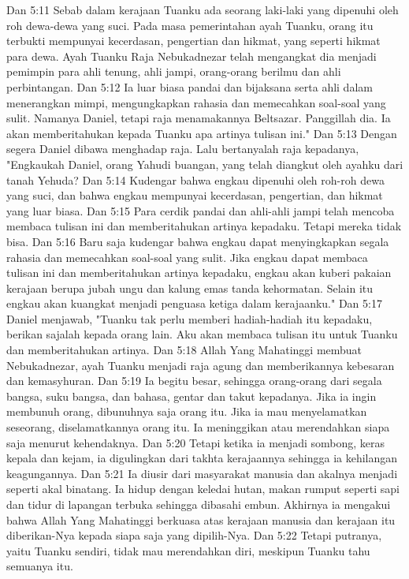 Dan 5:11  Sebab dalam kerajaan Tuanku ada seorang laki-laki yang dipenuhi oleh roh dewa-dewa yang suci. Pada masa pemerintahan ayah Tuanku, orang itu terbukti mempunyai kecerdasan, pengertian dan hikmat, yang seperti hikmat para dewa. Ayah Tuanku Raja Nebukadnezar telah mengangkat dia menjadi pemimpin para ahli tenung, ahli jampi, orang-orang berilmu dan ahli perbintangan.
Dan 5:12  Ia luar biasa pandai dan bijaksana serta ahli dalam menerangkan mimpi, mengungkapkan rahasia dan memecahkan soal-soal yang sulit. Namanya Daniel, tetapi raja menamakannya Beltsazar. Panggillah dia. Ia akan memberitahukan kepada Tuanku apa artinya tulisan ini."
Dan 5:13  Dengan segera Daniel dibawa menghadap raja. Lalu bertanyalah raja kepadanya, "Engkaukah Daniel, orang Yahudi buangan, yang telah diangkut oleh ayahku dari tanah Yehuda?
Dan 5:14  Kudengar bahwa engkau dipenuhi oleh roh-roh dewa yang suci, dan bahwa engkau mempunyai kecerdasan, pengertian, dan hikmat yang luar biasa.
Dan 5:15  Para cerdik pandai dan ahli-ahli jampi telah mencoba membaca tulisan ini dan memberitahukan artinya kepadaku. Tetapi mereka tidak bisa.
Dan 5:16  Baru saja kudengar bahwa engkau dapat menyingkapkan segala rahasia dan memecahkan soal-soal yang sulit. Jika engkau dapat membaca tulisan ini dan memberitahukan artinya kepadaku, engkau akan kuberi pakaian kerajaan berupa jubah ungu dan kalung emas tanda kehormatan. Selain itu engkau akan kuangkat menjadi penguasa ketiga dalam kerajaanku."
Dan 5:17  Daniel menjawab, "Tuanku tak perlu memberi hadiah-hadiah itu kepadaku, berikan sajalah kepada orang lain. Aku akan membaca tulisan itu untuk Tuanku dan memberitahukan artinya.
Dan 5:18  Allah Yang Mahatinggi membuat Nebukadnezar, ayah Tuanku menjadi raja agung dan memberikannya kebesaran dan kemasyhuran.
Dan 5:19  Ia begitu besar, sehingga orang-orang dari segala bangsa, suku bangsa, dan bahasa, gentar dan takut kepadanya. Jika ia ingin membunuh orang, dibunuhnya saja orang itu. Jika ia mau menyelamatkan seseorang, diselamatkannya orang itu. Ia meninggikan atau merendahkan siapa saja menurut kehendaknya.
Dan 5:20  Tetapi ketika ia menjadi sombong, keras kepala dan kejam, ia digulingkan dari takhta kerajaannya sehingga ia kehilangan keagungannya.
Dan 5:21  Ia diusir dari masyarakat manusia dan akalnya menjadi seperti akal binatang. Ia hidup dengan keledai hutan, makan rumput seperti sapi dan tidur di lapangan terbuka sehingga dibasahi embun. Akhirnya ia mengakui bahwa Allah Yang Mahatinggi berkuasa atas kerajaan manusia dan kerajaan itu diberikan-Nya kepada siapa saja yang dipilih-Nya.
Dan 5:22  Tetapi putranya, yaitu Tuanku sendiri, tidak mau merendahkan diri, meskipun Tuanku tahu semuanya itu.

